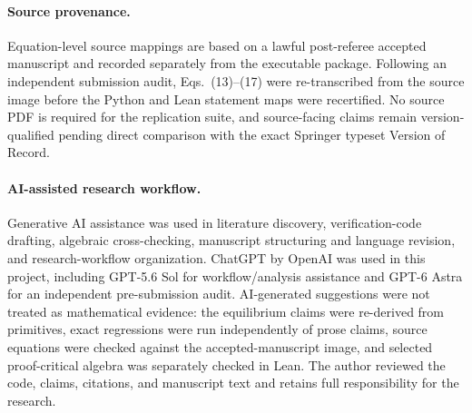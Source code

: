 \paragraph{Source provenance.}
Equation-level source mappings are based on a lawful post-referee accepted manuscript and recorded separately from the executable package. Following an independent submission audit, Eqs.~(13)--(17) were re-transcribed from the source image before the Python and Lean statement maps were recertified. No source PDF is required for the replication suite, and source-facing claims remain version-qualified pending direct comparison with the exact Springer typeset Version of Record.


\paragraph{AI-assisted research workflow.}
Generative AI assistance was used in literature discovery, verification-code drafting, algebraic cross-checking, manuscript structuring and language revision, and research-workflow organization. ChatGPT by OpenAI was used in this project, including GPT-5.6 Sol for workflow/analysis assistance and GPT-6 Astra for an independent pre-submission audit. AI-generated suggestions were not treated as mathematical evidence: the equilibrium claims were re-derived from primitives, exact regressions were run independently of prose claims, source equations were checked against the accepted-manuscript image, and selected proof-critical algebra was separately checked in Lean. The author reviewed the code, claims, citations, and manuscript text and retains full responsibility for the research.
